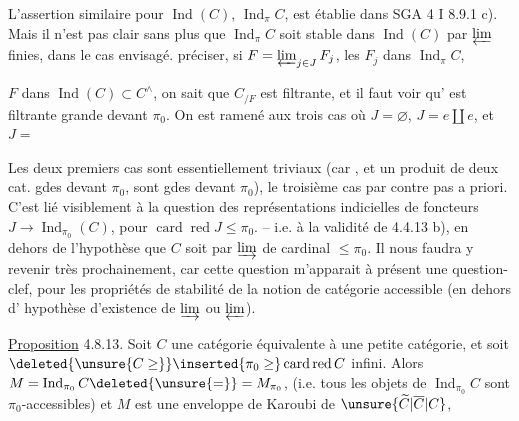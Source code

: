 L'assertion similaire pour $\operatorname{Ind}(C)$,  $\operatorname{Ind}_{\pi}C$, est établie dans SGA 4 I 8.9.1 c). Mais il n'est pas clair sans plus que $\operatorname{Ind}_{\pi}C$ soit stable dans $\operatorname{Ind}(C)$ par $\varprojlim$ finies, dans le cas envisagé.    préciser, si $F=\varprojlim_{j\in J}F_j$, les $F_j$ dans $\operatorname{Ind}_{\pi}C$,

$F$ dans $\operatorname{Ind}(C)\subset C^\wedge$, on sait que $C_{/F}$ est filtrante, et il faut voir qu' est filtrante grande devant $\pi_0$. On est ramené aux trois cas où $J=\varnothing$, $J=e\amalg e$, et $J=$


Les deux premiers cas sont essentiellement triviaux (car , et un produit de deux cat. gdes devant $\pi_0$, sont gdes devant $\pi_0$), le troisième cas par contre  pas   a priori. C'est lié visiblement à la question des représentations indicielles de foncteurs $J\longrightarrow\operatorname{Ind}_{\pi_0}(C)$, pour $\operatorname{card}\operatorname{red}J\leq\pi_0$. -- i.e. à la validité de 4.4.13 b), en dehors de l'hypothèse que $C$ soit  par $\varinjlim$ de cardinal $\leq\pi_0$. Il nous faudra y revenir très prochainement, car cette question m'apparait à présent une question-clef, pour les propriétés de stabilité de la notion de catégorie accessible (en dehors d' hypothèse d'existence de $\varinjlim$ ou $\varprojlim$).


\uline{Proposition} 4.8.13.  Soit $C$ une catégorie équivalente à une petite catégorie, et  soit $\deleted{\unsure{C\geq}}\inserted{\pi_0\geq}\operatorname{card}\operatorname{red}C$   infini. Alors $M=\operatorname{Ind}_{\pi_0}C\deleted{\unsure{=}}=M_{\pi_0}$,  (i.e. tous les objets de $\operatorname{Ind}_{\pi_0}C$ sont $\pi_0$-accessibles) et $M$ est une enveloppe de Karoubi de $\unsure{\widetilde C|\overline C|C}$,

